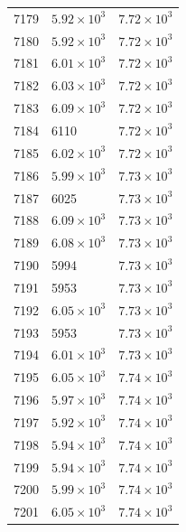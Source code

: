 \begin{table}[H]
\begin{tabular}{lll}
7179 & $\displaystyle 5.92 \times 10^{3}$ & $\displaystyle 7.72 \times 10^{3}$ \\
7180 & $\displaystyle 5.92 \times 10^{3}$ & $\displaystyle 7.72 \times 10^{3}$ \\
7181 & $\displaystyle 6.01 \times 10^{3}$ & $\displaystyle 7.72 \times 10^{3}$ \\
7182 & $\displaystyle 6.03 \times 10^{3}$ & $\displaystyle 7.72 \times 10^{3}$ \\
7183 & $\displaystyle 6.09 \times 10^{3}$ & $\displaystyle 7.72 \times 10^{3}$ \\
7184 & 6110 & $\displaystyle 7.72 \times 10^{3}$ \\
7185 & $\displaystyle 6.02 \times 10^{3}$ & $\displaystyle 7.72 \times 10^{3}$ \\
7186 & $\displaystyle 5.99 \times 10^{3}$ & $\displaystyle 7.73 \times 10^{3}$ \\
7187 & 6025 & $\displaystyle 7.73 \times 10^{3}$ \\
7188 & $\displaystyle 6.09 \times 10^{3}$ & $\displaystyle 7.73 \times 10^{3}$ \\
7189 & $\displaystyle 6.08 \times 10^{3}$ & $\displaystyle 7.73 \times 10^{3}$ \\
7190 & 5994 & $\displaystyle 7.73 \times 10^{3}$ \\
7191 & 5953 & $\displaystyle 7.73 \times 10^{3}$ \\
7192 & $\displaystyle 6.05 \times 10^{3}$ & $\displaystyle 7.73 \times 10^{3}$ \\
7193 & 5953 & $\displaystyle 7.73 \times 10^{3}$ \\
7194 & $\displaystyle 6.01 \times 10^{3}$ & $\displaystyle 7.73 \times 10^{3}$ \\
7195 & $\displaystyle 6.05 \times 10^{3}$ & $\displaystyle 7.74 \times 10^{3}$ \\
7196 & $\displaystyle 5.97 \times 10^{3}$ & $\displaystyle 7.74 \times 10^{3}$ \\
7197 & $\displaystyle 5.92 \times 10^{3}$ & $\displaystyle 7.74 \times 10^{3}$ \\
7198 & $\displaystyle 5.94 \times 10^{3}$ & $\displaystyle 7.74 \times 10^{3}$ \\
7199 & $\displaystyle 5.94 \times 10^{3}$ & $\displaystyle 7.74 \times 10^{3}$ \\
7200 & $\displaystyle 5.99 \times 10^{3}$ & $\displaystyle 7.74 \times 10^{3}$ \\
7201 & $\displaystyle 6.05 \times 10^{3}$ & $\displaystyle 7.74 \times 10^{3}$ \\

\end{tabular}
\end{table}

